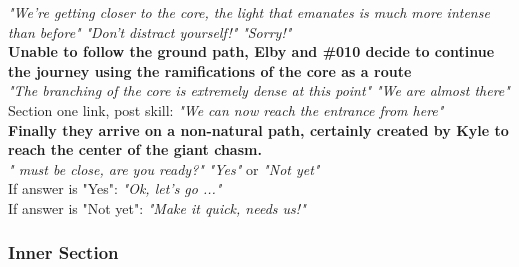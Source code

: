 \begin{dialogue}
	
	
	 \textit{"We're getting closer to the core, the light that emanates is much more intense than before"}
	  \textit{"Don't distract yourself!"}
	 \textit{"Sorry!"}\\
	
	
	\textbf{Unable to follow the ground path, Elby and \#010 decide to continue the journey using the ramifications of the core as a route}\\
	
	 \textit{"The branching of the core is extremely dense at this point"}
	 \textit{"We are almost there"}\\
	
	Section one link, post skill:
	 \textit{"We can now reach the entrance from here"}
	 \\
	
	
	\textbf{Finally they arrive on a non-natural path, certainly created by Kyle to reach the center of the giant chasm.}\\
	
	 \textit{" must be close, are you ready?"}
	 \textit{"Yes"} or \textit{"Not yet"}\\
	
	If answer is "Yes":
	 \textit{"Ok, let's go ..."}\\
	
	If answer is "Not yet":
	 \textit{"Make it quick,  needs us!"}
	
\end{dialogue}


\subsubsection{Inner Section}
\vspace*{0.3cm}

